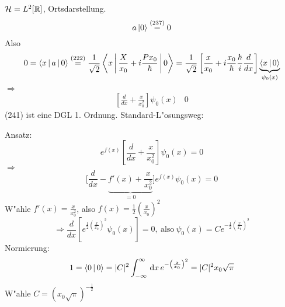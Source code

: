 \documentclass[a4paper]{scrartcl}
\begin{document}
{$\mathcal H = L^2[\mathbb{R}]$, Ortsdarstellung.
$$a \ket 0 \stackrel{(237)}= 0 $$
Also
$$0 = \Braket{ x | a | 0 } \stackrel{(222)}= \frac1{\sqrt 2} \Braket{ x | \frac X {x_0} + i \frac{P x_0 }\hbar | 0 } = \frac 1{\sqrt 2} \left[ \frac x {x_0} + i \frac{ x_0}\hbar \frac \hbar i \frac d {dx} \right] \underbrace{ \Braket{ x| 0}}_{\psi_0(x)}$$
$\Longrightarrow$
\begin{align}
\left[ \frac d{dx} + \frac x{x_0^2} \right] \psi_0(x) & 0 
\end{align}
(241) ist eine DGL 1. Ordnung. Standard-L"osungsweg:

Ansatz: 
$$e^{f(x)} \left[ \frac d{dx} + \frac x{x_0^2} \right] \psi_0(x) = 0$$
$\Longrightarrow$
$$\Big[ \frac d {dx} - \underbrace{f'(x) + \frac x {x_0^2} }_{=0} \Big] e^{f(x)} \psi_0(x) = 0$$
W"ahle $f'(x) = \frac x {x_0^2}$, also $f(x) = \frac12 \left( \frac x{x_0} \right)^2$
$$\Longrightarrow \frac d{dx} \left[ e^{\frac 12 \left( \frac x{x_0} \right)^2} \psi_0(x) \right] =0, \ \mathrm{ also \ } \psi_0(x) = C e^{-\frac12 \left( \frac x{x_0} \right)^2}$$
Normierung:
$$1 = \Braket {0 | 0 } = \vert C \vert^2 \int_{-\infty}^\infty \, \mathrm{d} x \, e^{- \left( \frac x{x_0} \right)^2} = \vert C \vert^2 x_0 \sqrt \pi$$
W"ahle $C = (x_0 \sqrt \pi)^{-\frac 12}$

}
\end{document}
